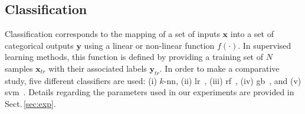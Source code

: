 
\subsection{Classification}\label{subsec:cls}

Classification corresponds to the mapping of a set of inputs $\mathbf{x}$ into a set of categorical outputs $\mathbf{y}$ using a linear or non-linear function $f(\cdot)$.
In supervised learning methods, this function is defined by providing a training set of $N$ samples $\mathbf{x}_{tr}$ with their associated labels $\mathbf{y}_{tr}$.
In order to make a comparative study, five different classifiers are used: (i) $k$-\acf{nn}, (ii) \acf{lr}~\cite{cox1958regression}, (iii) \acf{rf}~\cite{breiman2001random}, (iv) \acf{gb}~\cite{friedman2002stochastic, lemaitre2015boosting}, and (v) \acf{svm}~\cite{vapnik1963generalized, aizerman1964}.
Details regarding the parameters used in our experiments are provided in Sect.\,\ref{sec:exp}.

